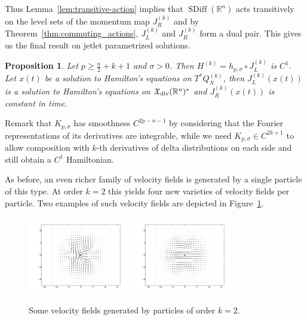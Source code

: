 \documentclass[12pt]{amsart}
\newcommand{\R}{\ensuremath{\mathbb{R}}}
\newtheorem{prop}[thm]{Proposition}
\DeclareMathOperator{\SDiff}{SDiff}
\begin{document}
  Thus Lemma~\ref{lem:transitive-action} implies that $\SDiff(\R^n)$
  acts transitively on the level sets of the momentum map $J_R^{(k)}$
  and by Theorem~\ref{thm:commuting_actions}, $J_L^{(k)}$ and
  $J_R^{(k)}$ form a dual pair. This gives us the final result on
  jetlet parametrized solutions.
  \begin{prop}\label{prop:k-solutions}
    Let $p \ge \frac{n}{2} + k + 1$ and $\sigma > 0$.
    Then $H^{(k)} = h_{p,\sigma} \circ J_L^{(k)}$ is $C^1$.
    Let $x(t)$ be a solution to Hamilton's equations on
    $T^*Q^{(k)}_N$, then $J_L^{(k)}( x(t))$ is a solution to Hamilton's
    equations on $\mathfrak{X}_{\rm div}(\R^n)^*$
    and $J_R^{(k)}( x(t))$ is constant in time.
  \end{prop}
  Remark that $K_{p,\sigma}$ has smoothness $C^{2p-n-1}$ by considering
  that the Fourier representations of its derivatives are integrable,
  while we need $K_{p,\sigma} \in C^{2k+1}$ to allow composition with
  $k$-th derivatives of delta distributions on each side and still
  obtain a $C^1$ Hamiltonian.

  As before, an even richer family of velocity fields is generated by a single particle of this type.
  At order $k=2$ this yields four new varieties of velocity fields per particle.
  Two examples of such velocity fields are depicted in Figure~\ref{fig:2_jet}.
  
  \begin{figure}[h!]
  	\centering
	\includegraphics[width=0.4\textwidth]{two_jet_a_2D.pdf}
	\includegraphics[width=0.4\textwidth]{two_jet_b_2D.pdf}
	\caption{Some velocity fields generated by particles of order $k=2$.}
	\label{fig:2_jet}
  \end{figure}
  
\end{document}
